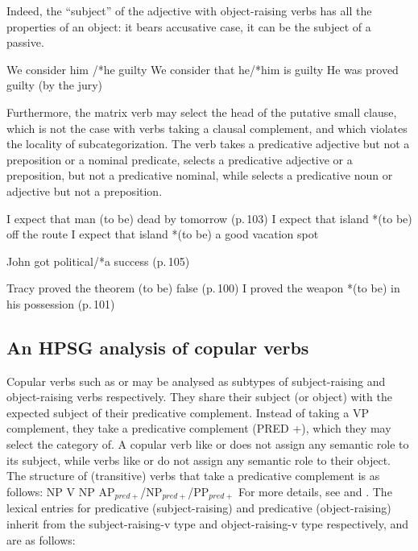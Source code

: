 \documentclass[output=paper]{langsci/langscibook}
\begin{document}
 Indeed, the ``subject'' of the adjective with object-raising verbs has all the properties of an object: it bears accusative case, it can be the subject of a passive.

\begin{exe}
\ex \begin{xlist}
\ex We consider him /*he guilty
\ex 	We consider that he/*him is guilty
\ex 	He was proved guilty (by the jury)	
\end{xlist}
\end{exe}
	

Furthermore, the matrix verb may select the head of the putative small clause, which is not the case with verbs taking a clausal complement, and which violates the locality of subcategorization. The verb takes a predicative adjective but not a preposition or a nominal predicate,  selects a predicative adjective or a preposition, but not a predicative nominal, while  selects a predicative noun or adjective but not a preposition.


\begin{exe}
\ex \begin{xlist}
\ex I expect that man (to be) dead  by tomorrow (p.\,103)
\ex I expect that island *(to be) off the route
\ex I expect that island *(to be) a good vacation spot
\end{xlist}
\ex John got political/*a success (p.\,105)	
\ex\begin{xlist}
\ex Tracy proved the theorem (to be) false (p.\,100)
\ex  I proved the weapon *(to be) in his possession	(p.\,101)
\end{xlist}

\end{exe}
	


\subsection{An HPSG analysis of copular verbs}
	
Copular verbs such as  or  may be analysed as subtypes of subject-raising and object-raising verbs respectively. They share their subject (or object) with the expected subject of their predicative complement. Instead of taking a VP complement, they take a predicative complement (PRED +), which they may select the category of.
A copular verb like  or  does not assign any semantic role to its subject, while
verbs like  or  do not assign any semantic role to their object. The
structure of (transitive) verbs that take a predicative complement is as follows:
\ea
NP V NP AP$_{pred+}$/NP$_{pred+}$/PP$_{pred+}$
\z
For more details, see  and  . 
The lexical entries for predicative (subject-raising)  and predicative (object-raising)  inherit from the subject-raising-v type and object-raising-v type respectively, and are as follows:
\end{document}
